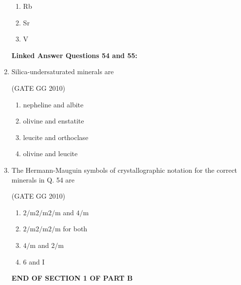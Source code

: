 \documentclass[journal]{IEEEtran}
\begin{document}
\begin{enumerate}[start=1]
\begin{enumerate}
\item Rb

\item Sr

\item V
\end{enumerate}

\textbf{Linked Answer Questions 54 and 55:}
\item Silica-undersaturated minerals are

\hfill{(GATE GG 2010)}

\begin{enumerate}
    \item nepheline and albite

\item  olivine and enstatite

\item leucite and orthoclase

\item olivine and leucite

\end{enumerate}
    
\item The Hermann-Mauguin symbols of crystallographic notation for the correct minerals in Q. 54 are

\hfill{(GATE GG 2010)}

\begin{enumerate}
    \item $2/ \text{m}2/ \text{m}2/ \text{m}$ and $4/ \text{m}$
    \item $2/ \text{m}2/ \text{m}2/ \text{m}$ for both
    \item $4/ \text{m}$ and  $2/ \text{m}$
    \item $6$ and I
    
\end{enumerate}
\vspace{1cm}
\hspace{3cm} \textbf{END OF SECTION 1 OF PART B}
\end{enumerate}
\end{document}
